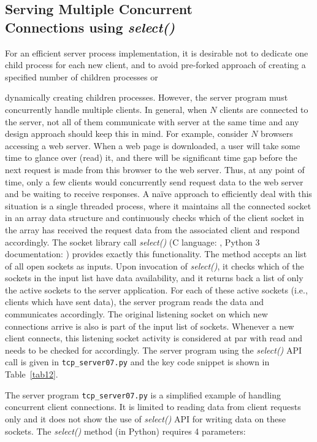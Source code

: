 \begin{multicols}{2}
\section{Serving Multiple Concurrent\\ Connections using \textit{select()}}

For an efficient server process implementation, it is desirable not to dedicate one child process for each new client, and to avoid pre-forked approach of creating a specified number of children processes or 

dynamically creating children processes. However, the server program must concurrently handle multiple clients. In general, when $N$ clients are connected to the server, not all of them communicate with server at the same time and any design approach should keep this in mind. For example, consider $N$ browsers accessing a web server. When a web page is downloaded, a user will take some time to glance over (read) it, and there will be significant time gap before the next request is made from this browser to the web server. Thus, at any point of time, only a few clients would concurrently send request data to the web server and be waiting to receive responses. A naïve approach to efficiently deal with this situation is a single threaded process, where it maintains all the connected socket in an array data structure and continuously checks which of the client socket in the array has received the request data from the associated client and respond accordingly. The socket library call \textit{select()} (C language: \cite{art1-key20}, Python 3 documentation: \cite{art1-key21}) provides exactly this functionality. The method accepts an list of all open sockets as inputs. Upon invocation of \textit{select()}, it checks which of the sockets in the input list have data availability, and it returns back a list of only the active sockets to the server application. For each of these active sockets (i.e., clients which have sent data), the server program reads the data and communicates accordingly. The original listening socket on which new connections arrive is also is part of the input list of sockets. Whenever a new client connects, this listening socket activity is considered at par with read and needs to be checked for accordingly. The server program using the \textit{select()} API call is given in \texttt{tcp\_server07.py} \cite{art1-key17} and the key code snippet is shown in Table~\ref{tab12}.

The server program \texttt{tcp\_server07.py} is a simplified example of handling concurrent client connections. It is limited to reading data from client requests only and it does not show the use of \textit{select()} API for writing data on these sockets. The \textit{select()} method (in Python) requires 4 parameters:


\end{multicols}
